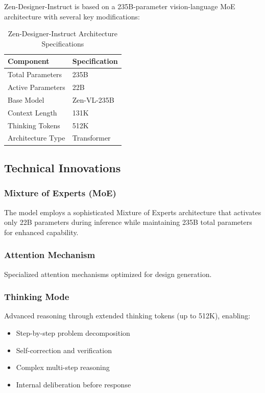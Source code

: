 \documentclass[11pt,a4paper]{article}
\begin{document}
Zen-Designer-Instruct is based on a 235B-parameter vision-language MoE architecture with several key modifications:

\begin{table}[H]
\centering
\begin{tabular}{ll}
\toprule
\textbf{Component} & \textbf{Specification} \\
\midrule
Total Parameters & 235B \\
Active Parameters & 22B \\
Base Model & Zen-VL-235B \\
Context Length & 131K \\
Thinking Tokens & 512K \\

Architecture Type & Transformer \\
\bottomrule
\end{tabular}
\caption{Zen-Designer-Instruct Architecture Specifications}
\end{table}

\subsection{Technical Innovations}

\subsubsection{Mixture of Experts (MoE)}
The model employs a sophisticated Mixture of Experts architecture that activates only 22B parameters 
during inference while maintaining 235B total parameters for enhanced capability.

\subsubsection{Attention Mechanism}
Specialized attention mechanisms optimized for design generation.

\subsubsection{Thinking Mode}
Advanced reasoning through extended thinking tokens (up to 512K), enabling:
\begin{itemize}
    \item Step-by-step problem decomposition
    \item Self-correction and verification
    \item Complex multi-step reasoning
    \item Internal deliberation before response
\end{itemize}
\end{document}
